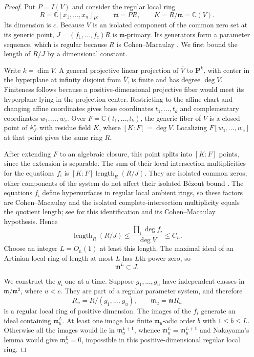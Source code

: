 \begin{proof}
Put $P=I(V)$ and consider the regular local ring
\[
 R=\mathbb C[x_1,\ldots,x_n]_P,\qquad
 \mathfrak m=PR,\qquad K=R/\mathfrak m=\mathbb C(V).
\]
Its dimension is $c$.  Because $V$ is an isolated component of the
common zero set at its generic point, $J=(f_1,\ldots,f_c)R$ is
$\mathfrak m$-primary.  Its generators form a parameter sequence,
which is regular because $R$ is Cohen--Macaulay
\cite[Tags~00OQ, 00NQ, and 02JN]{stacksproject}.
We first bound the length of $R/J$ by a dimensional constant.

Write $k=\dim V$.  A general projective linear projection of
$\overline V$ to $\mathbf P^k$, with center in the hyperplane at
infinity disjoint from $\overline V$, is finite and has degree
$\deg V$.  Finiteness follows because a positive-dimensional projective
fiber would meet its hyperplane lying in the projection center.
Restricting to the affine chart and changing affine coordinates gives
base coordinates $t_1,\ldots,t_k$ and complementary coordinates
$w_1,\ldots,w_c$.  Over $F=\mathbb C(t_1,\ldots,t_k)$, the generic
fiber of $V$ is a closed point of $\mathbb A^c_F$ with residue field
$K$, where $[K:F]=\deg V$.  Localizing $F[w_1,\ldots,w_c]$ at that
point gives the same ring $R$.

After extending $F$ to an algebraic closure, this point splits into
$[K:F]$ points, since the extension is separable.  The sum of their
local intersection multiplicities for the equations $f_i$ is
$[K:F]\operatorname{length}_R(R/J)$.  They are isolated common zeros;
other components of the system do not affect their isolated B\'ezout
bound \cite[Theorem~12.3 and Example~12.3.1]{fulton1998}.
The equations $f_i$ define hypersurfaces in regular local ambient
rings, so these factors are Cohen--Macaulay and the isolated
complete-intersection multiplicity equals the quotient length;
see \cite[Example~12.3.7(ii)--(iii)]{fulton1998} for this identification
and its Cohen--Macaulay hypothesis.  Hence
\begin{equation}
 \operatorname{length}_R(R/J)
 \leq\frac{\prod_i\deg f_i}{\deg V}\leq C_n.
 \label{conc:local-length}
\end{equation}
Choose an integer $L=O_n(1)$ at least this length.  The maximal ideal
of an Artinian local ring of length at most $L$ has $L$th power zero,
so
\begin{equation}
 \mathfrak m^L\subset J.
 \label{conc:adic-bound}
\end{equation}

We construct the $g_i$ one at a time.  Suppose $g_1,\ldots,g_u$ have
independent classes in $\mathfrak m/\mathfrak m^2$, where $u<c$.
They are part of a regular parameter system, and therefore
\[
 R_u=R/(g_1,\ldots,g_u),\qquad
 \mathfrak m_u=\mathfrak mR_u
\]
is a regular local ring of positive dimension.  The images of the
$f_i$ generate an ideal containing $\mathfrak m_u^L$.  At least one
image has finite $\mathfrak m_u$-adic order $b$ with $1\leq b\leq L$.
Otherwise all the images would lie in $\mathfrak m_u^{L+1}$, whence
$\mathfrak m_u^L=\mathfrak m_u^{L+1}$ and Nakayama's lemma would give
$\mathfrak m_u^L=0$, impossible in this positive-dimensional regular
local ring.


\end{proof}
